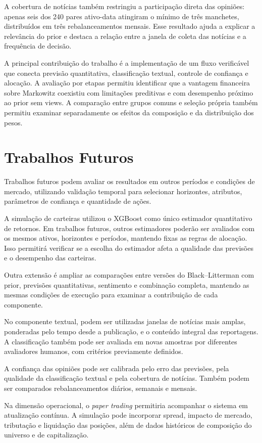 A cobertura de notícias também restringiu a participação
direta das opiniões: apenas seis dos 240 pares ativo-data
atingiram o mínimo de três manchetes, distribuídos em
três rebalanceamentos mensais. Esse resultado ajuda a
explicar a relevância do prior e destaca a relação entre
a janela de coleta das notícias e a frequência de decisão.

A principal contribuição do trabalho é a implementação
de um fluxo verificável que conecta previsão quantitativa,
classificação textual, controle de confiança e alocação.
A avaliação por etapas permitiu identificar que a vantagem
financeira sobre Markowitz coexistiu com limitações
preditivas e com desempenho próximo ao prior sem views.
A comparação entre grupos comuns e seleção própria
também permitiu examinar separadamente os efeitos da
composição e da distribuição dos pesos.

\section{Trabalhos Futuros}
\label{sec:conclusao_trabalhos_futuros}

Trabalhos futuros podem avaliar os resultados em outros
períodos e condições de mercado, utilizando validação
temporal para selecionar horizontes, atributos, parâmetros
de confiança e quantidade de ações.

A simulação de carteiras utilizou o XGBoost como único
estimador quantitativo de retornos. Em trabalhos futuros,
outros estimadores poderão ser avaliados com os mesmos
ativos, horizontes e períodos, mantendo fixas as regras
de alocação. Isso permitirá verificar se a escolha do
estimador afeta a qualidade das previsões e o desempenho
das carteiras.

Outra extensão é ampliar as comparações entre versões
do Black--Litterman com prior, previsões quantitativas,
sentimento e combinação completa, mantendo as mesmas
condições de execução para examinar a contribuição de
cada componente.

No componente textual, podem ser utilizadas janelas de
notícias mais amplas, ponderadas pelo tempo desde a publicação,
e o conteúdo integral das reportagens. A classificação
também pode ser avaliada em novas amostras por diferentes
avaliadores humanos, com critérios previamente definidos.

A confiança das opiniões pode ser calibrada pelo erro
das previsões, pela qualidade da classificação textual
e pela cobertura de notícias. Também podem ser comparados
rebalanceamentos diários, semanais e mensais.

Na dimensão operacional, o \emph{paper trading} permitiria
acompanhar o sistema em atualização contínua. A simulação
pode incorporar spread, impacto de mercado, tributação
e liquidação das posições, além de dados históricos
de composição do universo e de capitalização.